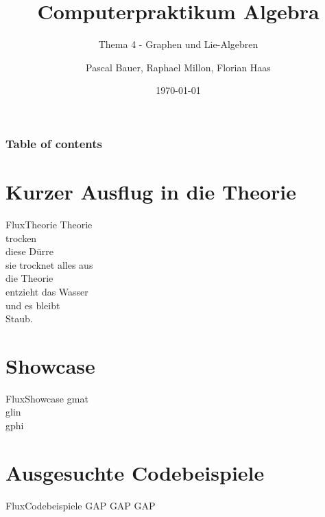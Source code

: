 \documentclass[9pt]{beamer}
\title{Computerpraktikum Algebra}
\subtitle{Thema 4 - Graphen und Lie-Algebren}
\author{Pascal Bauer, Raphael Millon, Florian Haas}
\institute{Sommersemester 2020}
\date{\today}
\begin{document}
\titlepage 

\begin{frame}
 \frametitle{Table of contents}
 \tableofcontents
\end{frame}

\section{Kurzer Ausflug in die Theorie}
\begin{frame}{Flux}{Theorie}
\centering
	Theorie\\
	trocken\\
	diese Dürre\\
	sie trocknet alles aus\\
	die Theorie\\
	entzieht das Wasser\\
	und es bleibt\\
	Staub.
\end{frame}
\section{Showcase}
\begin{frame}{Flux}{Showcase}
gmat\\
glin\\
gphi\\
\end{frame}
\section{Ausgesuchte Codebeispiele}
\begin{frame}{Flux}{Codebeispiele}
GAP GAP GAP
\end{frame}
\end{document}
